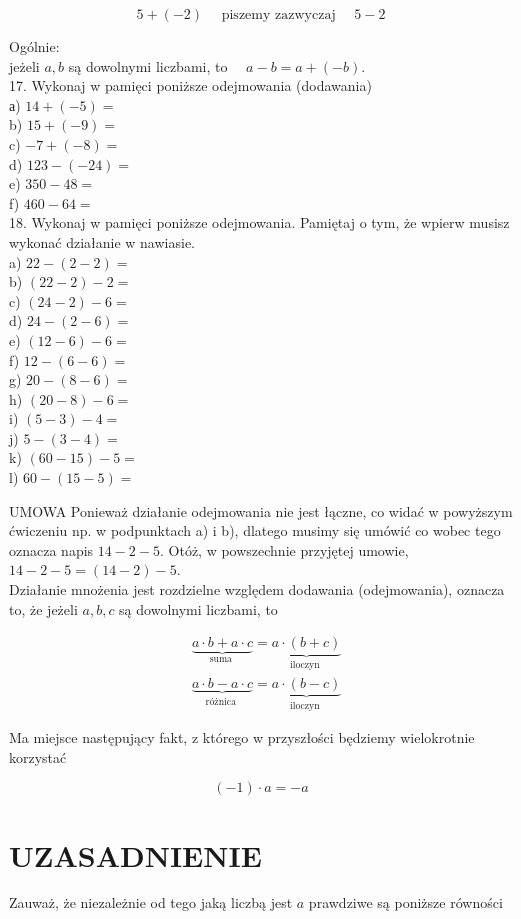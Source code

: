 \documentclass[10pt]{article}
\begin{document}
\[
5+(-2) \quad \text { piszemy zazwyczaj } \quad 5-2
\]

Ogólnie:\\
jeżeli \(a, b\) są dowolnymi liczbami, to \(\quad a-b=a+(-b)\).\\
17. Wykonaj w pamięci poniższe odejmowania (dodawania)\\
а) \(14+(-5)=\)\\
b) \(15+(-9)=\)\\
c) \(-7+(-8)=\)\\
d) \(123-(-24)=\)\\
e) \(350-48=\)\\
f) \(460-64=\)\\
18. Wykonaj w pamięci poniższe odejmowania. Pamiętaj o tym, że wpierw musisz wykonać działanie w nawiasie.\\
a) \(22-(2-2)=\)\\
b) \((22-2)-2=\)\\
c) \((24-2)-6=\)\\
d) \(24-(2-6)=\)\\
e) \((12-6)-6=\)\\
f) \(12-(6-6)=\)\\
g) \(20-(8-6)=\)\\
h) \((20-8)-6=\)\\
i) \((5-3)-4=\)\\
j) \(5-(3-4)=\)\\
k) \((60-15)-5=\)\\
l) \(60-(15-5)=\)

UMOWA Ponieważ działanie odejmowania nie jest łączne, co widać w powyższym ćwiczeniu np. w podpunktach a) i b), dlatego musimy się umówić co wobec tego oznacza napis \(14-2-5\). Otóż, w powszechnie przyjętej umowie, \(14-2-5=(14-2)-5\).\\
Działanie mnożenia jest rozdzielne względem dodawania (odejmowania), oznacza to, że jeżeli \(a, b, c\) są dowolnymi liczbami, to

\[
\begin{aligned}
& \underbrace{a \cdot b+a \cdot c}_{\text {suma }}=\underbrace{a \cdot(b+c)}_{\text {iloczyn }} \\
& \underbrace{a \cdot b-a \cdot c}_{\text {różnica }}=\underbrace{a \cdot(b-c)}_{\text {iloczyn }}
\end{aligned}
\]

Ma miejsce następujący fakt, z którego w przyszłości będziemy wielokrotnie korzystać

\[
(-1) \cdot a=-a
\]

\section*{UZASADNIENIE}
Zauważ, że niezależnie od tego jaką liczbą jest \(a\) prawdziwe są poniższe równości
\end{document}
